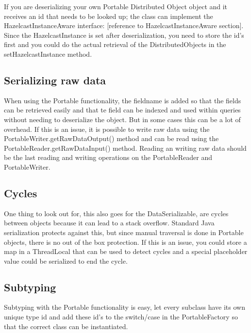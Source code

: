 If you are deserializing your own Portable Distributed Object object and it receives an id that needs to be looked up; the class can implement the HazelcastInstanceAware interface: [reference to HazelcastInstanceAware section]. Since the HazelcastInstance is set after deserialization, you need to store the id's first and you could do the actual retrieval of the DistributedObjects in the setHazelcastInstance method.

\subsection{Serializing raw data}
When using the Portable functionality, the fieldname is added so that the fields can be retrieved easily and that te field can be indexed and used within queries without needing to deserialize the object. But in some cases this can be a lot of overhead. If this is an issue, it is possible to write raw data using the PortableWriter.getRawDataOutput() method and can be read using the PortableReader.getRawDataInput() method. Reading an writing raw data should be the last reading and writing operations on the PortableReader and PortableWriter.

\subsection*{Cycles}
One thing to look out for, this also goes for the DataSerializable, are cycles between objects because it can lead to a stack overflow. Standard Java serialization protects against this, but since manual traversal is done in Portable objects, there is no out of the box protection. If this is an issue, you could store a map in a ThreadLocal that can be used to detect cycles and a special placeholder value could be serialized to end the cycle.

\subsection*{Subtyping}
Subtyping with the Portable functionality is easy, let every subclass have its own unique type id and add these id's to the switch/case in the PortableFactory so that the correct class can be instantiated. 

